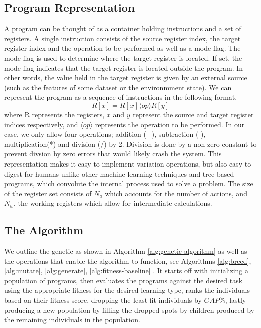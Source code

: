 \documentclass[12pt, final]{dalcsthesis}
\begin{document}
\subsection{Program Representation}
A program can be thought of as a container holding instructions and a set of registers. A single instruction consists of the source register index, the target register index and the operation to be performed as well as a mode flag. The mode flag is used to determine where the target register is located. If set, the mode flag indicates that the target register is located outside the program. In other words, the value held in the target register is given by an external source (such as the features of some dataset or the environmment state). We can represent the program as a sequence of instructions in the following format. $$R[x] = R[x] \langle op \rangle  R[y]$$ where R represents the registers, $x$ and $y$ represent the source and target register indices respectively, and $\langle op \rangle$ represents the operation to be performed. In our case, we only allow four operations; addition (+),
subtraction (-), multiplication(*) and division (/) by 2. Division is done by a non-zero constant to prevent divsion by zero errors that would likely crash the system. This representation makes it easy to implement variation operations, but also easy to digest for humans unlike other machine learning techniques and tree-based programs, which convolute the internal process used to solve a problem. The size of the register set consists of $N_a$ which accounts for the number of actions, and $N_w$, the working registers which allow for intermediate calculations.

\subsection{The Algorithm}

We outline the genetic as shown in Algorithm \ref{alg:genetic-algorithm}
as well as the operations that enable the algorithm to function, see Algorithms \ref{alg:breed}, \ref{alg:mutate}, \ref{alg:generate}, \ref{alg:fitness-baseline} . It starts off with initializing a population of programs, then evaluates the programs against the desired task using the appropriate fitness for the desired learning type, ranks the individuals based on their fitness score,
dropping the least fit individuals by $GAP\%$, lastly producing a new population by filling the
dropped spots by children produced by the remaining individuals in the population.
\end{document}

